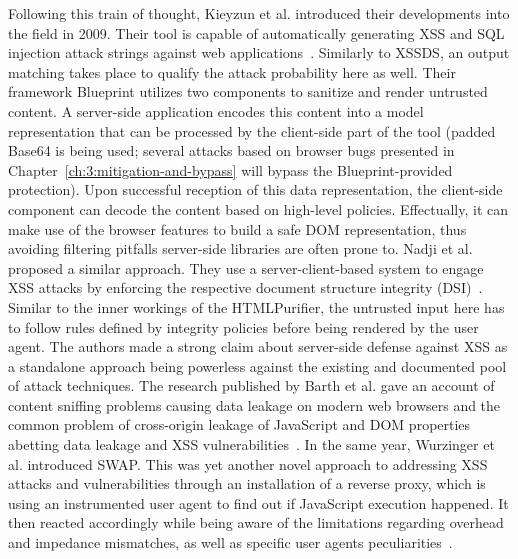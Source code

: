 \begin{itemize}
      Following this train of thought, Kieyzun et al. introduced their developments into the field in 2009. Their tool is capable of automatically generating XSS and SQL injection attack strings against web applications~\cite{kieyzun2009automatic}. Similarly to XSSDS, an output matching takes place to qualify the attack probability here as well. Their framework Blueprint utilizes two components to sanitize and render untrusted content. A server-side application encodes this content into a model representation that can be processed by the client-side part of the tool (padded Base64 is being used; several attacks based on browser bugs presented in Chapter~\ref{ch:3:mitigation-and-bypass} will bypass the Blueprint-provided protection). Upon successful reception of this data representation, the client-side component can decode the content based on high-level policies. Effectually, it can make use of the browser features to build a safe DOM representation, thus avoiding filtering pitfalls server-side libraries are often prone to. Nadji et al. proposed a similar approach. They use a server-client-based system to engage XSS attacks by enforcing the respective document structure integrity (DSI)~\cite{nadji2009document}. Similar to the inner workings of the HTMLPurifier, the untrusted input here has to follow rules defined by integrity policies before being rendered by the user agent. The authors made a strong claim about server-side defense against XSS as a standalone approach being powerless against the existing and documented pool of attack techniques. The research published by Barth et al. gave an account of content sniffing problems causing data leakage on modern web browsers and the common problem of cross-origin leakage of JavaScript and DOM properties abetting data leakage and XSS vulnerabilities~\cite{barth2009cross,barth2009secure}. In the same year, Wurzinger et al. introduced SWAP. This was yet another novel approach to addressing XSS attacks and vulnerabilities through an installation of a reverse proxy, which is using an instrumented user agent to find out if JavaScript execution happened. It then reacted accordingly while being aware of the limitations regarding overhead and impedance mismatches, as well as specific user agents peculiarities~\cite{wurzinger2009swap}.\\


\end{itemize}
